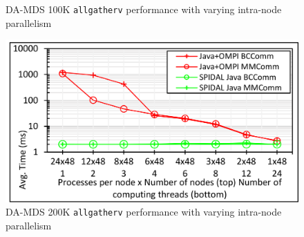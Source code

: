 \begin{figure}[!htb]
\begin{minipage}{0.49\textwidth}
		\caption{DA-MDS 100K \texttt{allgatherv} performance with varying intra-node parallelism}
        \label{fig:fig_100K_TP_allgatherv}
    \end{minipage}
    \begin{minipage}{0.49\textwidth}
        \centering
        \includegraphics[width=0.85\columnwidth]{figures/fig_200K_TP_allgatherv}
		\caption{DA-MDS 200K \texttt{allgatherv} performance with varying intra-node parallelism}
		\label{fig:fig_200K_TP_allgatherv}
    \end{minipage}        
\end{figure}     


